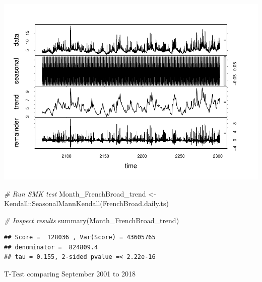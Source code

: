 \documentclass[
  12pt,
]{article}
\newenvironment{Shaded}{\begin{snugshade}}{\end{snugshade}}
\newcommand{\CommentTok}[1]{\textcolor[rgb]{0.56,0.35,0.01}{\textit{#1}}}
\newcommand{\DecValTok}[1]{\textcolor[rgb]{0.00,0.00,0.81}{#1}}
\newcommand{\DocumentationTok}[1]{\textcolor[rgb]{0.56,0.35,0.01}{\textbf{\textit{#1}}}}
\newcommand{\FunctionTok}[1]{\textcolor[rgb]{0.00,0.00,0.00}{#1}}
\newcommand{\NormalTok}[1]{#1}
\newcommand{\OtherTok}[1]{\textcolor[rgb]{0.56,0.35,0.01}{#1}}
\newcommand{\SpecialCharTok}[1]{\textcolor[rgb]{0.00,0.00,0.00}{#1}}
\begin{document}
\includegraphics{Project_Template_files/figure-latex/TimeSeries-3.pdf}

\begin{Shaded}
\begin{Highlighting}[]
\CommentTok{\# Run SMK test}
\NormalTok{Month\_FrenchBroad\_trend }\OtherTok{\textless{}{-}}\NormalTok{ Kendall}\SpecialCharTok{::}\FunctionTok{SeasonalMannKendall}\NormalTok{(FrenchBroad.daily.ts)}

\CommentTok{\# Inspect results}
\FunctionTok{summary}\NormalTok{(Month\_FrenchBroad\_trend)}
\end{Highlighting}
\end{Shaded}

\begin{verbatim}
## Score =  128036 , Var(Score) = 43605765
## denominator =  824809.4
## tau = 0.155, 2-sided pvalue =< 2.22e-16
\end{verbatim}

T-Test comparing September 2001 to 2018

\begin{Shaded}
\end{Shaded}
\end{document}
